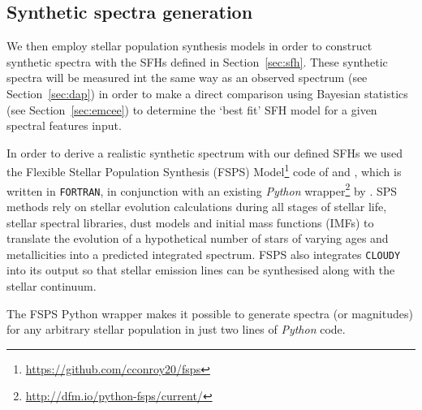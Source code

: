 \documentclass[useAMS,usenatbib]{mn2e}
\begin{document}
\subsection{Synthetic spectra generation}\label{sec:fsps}

We then employ stellar population synthesis models in order to construct synthetic spectra with the SFHs defined in Section~\ref{sec:sfh}. These synthetic spectra will be measured int the same way as an observed spectrum (see Section~\ref{sec:dap}) in order to make a direct comparison using Bayesian statistics (see Section~\ref{sec:emcee}) to determine the `best fit' SFH model for a given spectral features input. 

In order to derive a realistic synthetic spectrum with our defined SFHs we used the Flexible Stellar Population Synthesis (FSPS) Model\footnote{\url{https://github.com/cconroy20/fsps}} code of \cite{conroy09} and \citet{conroy10}, which is written in \texttt{FORTRAN}, in conjunction with an existing \emph{Python} wrapper\footnote{\url{http://dfm.io/python-fsps/current/}} by \cite{python_fsps}. SPS methods rely on stellar evolution calculations during all stages of stellar life, stellar spectral libraries, dust models and initial mass functions (IMFs) to translate the evolution of a hypothetical number of stars of varying ages and metallicities into a predicted integrated spectrum. FSPS also integrates \texttt{CLOUDY} \citep{ferland13} into its output so that stellar emission lines can be synthesised along with the stellar continuum. 

The FSPS Python wrapper makes it possible to generate spectra (or magnitudes) for any arbitrary stellar population in just two lines of \emph{Python} code. 

\end{document}
